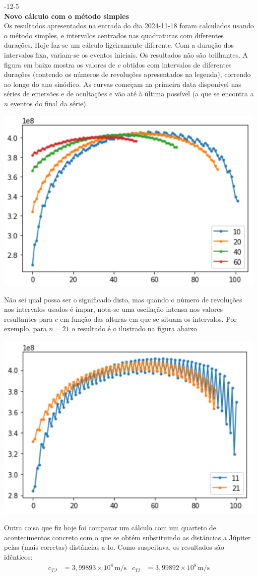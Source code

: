 \documentclass[]{article}
\newcommand{\newlog}[2]{%
  \par
  \vspace{\baselineskip}
  \noindent
  #1\\
  \textbf{#2}\\
}
\begin{document}
\newlog{2024-12-5}{Novo cálculo com o método simples}
Os resultados apresentados na entrada do dia 2024-11-18 foram calculados usando
o método simples, e intervalos centrados nas quadraturas com diferentes
durações. Hoje faz-se um cálculo ligeiramente diferente. Com a duração dos
intervalos fixa, variam-se os eventos iniciais. Os resultados não são
brilhantes. A figura em baixo mostra os valores de $c$ obtidos com intervalos de
diferentes durações (contendo os números de revoluções apresentados na legenda),
correndo ao longo do ano sinódico. As curvas começam na primeira data disponível
nas séries de emersões e de ocultações e vão até à última possível (a que se
encontra a $n$ eventos do final da série).
\begin{center}
  \includegraphics[width=0.5\linewidth]{figs/2024-12-05.png}
\end{center}

Não sei qual possa ser o significado disto, mas quando o número de revoluções
nos intervalos usados é ímpar, nota-se uma oscilação intensa nos valores
resultantes para $c$ em função das alturas em que se situam os intervalos. Por
exemplo, para $n=21$ o resultado é o ilustrado na figura abaixo
\begin{center}
  \includegraphics[width=0.5\linewidth]{figs/2024-12-05b.png}
\end{center}

Outra coisa que fiz hoje foi comparar um cálculo com um quarteto de
acontecimentos concreto com o que se obtém substituindo as distâncias a Júpiter
pelas (mais corretas) distâncias a Io. Como suspeitava, os resultados são
idênticos:
\begin{align*}
  c_{TJ}& = 3,99893\times10^8\,\text{m/s}&
  c_{TI}& = 3,99892\times10^8\,\text{m/s}
\end{align*}
\end{document}
